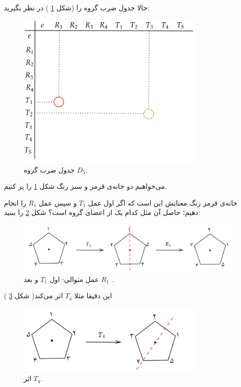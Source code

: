 \documentclass[a4paper, 12pt]{article}
\begin{document}
حالا جدول ضرب گروه را (شکل
\ref{prodtab}
) در نظر بگیرید:
\begin{figure}[h]
	\centering
	\includegraphics[width=25em]{4.png}
	\caption{جدول ضرب گروه 
	$D_5$.
	 }
	 \label{prodtab}
\end{figure}

\noindent
می‌خواهیم دو خانه‌ی قرمز و سبز رنگ شکل
\ref{prodtab}
را پر کنیم.

\noindent
 خانه‌ی قرمز رنگ معنایش این است که اگر اول عمل 
$T_1$
و سپس عمل 
$R_1$
را انجام دهیم؛ حاصل آن مثل کدام یک از اعضای گروه است؟ شکل 
\ref{firstex}
را ببنید:
\begin{figure}[h]
	\centering
	\includegraphics[width=35em]{5.png}
	\caption{عمل متوالی: اول 
	$T_1$ و بعد 
	$R_1$
.
	}
	\label{firstex}
\end{figure}
این دقیقا مثلا 
$T_4$
اثر می‌کند( شکل 
\ref{firstex2}
)

\begin{figure}[h]
	\centering
	\includegraphics[width=25em]{6.png}
	\caption{اثر
		 $T_4$.
	}
	\label{firstex2}
\end{figure}
\end{document}
